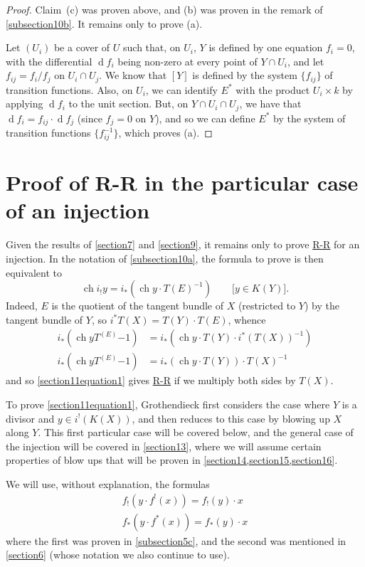 \documentclass{article}
\theoremstyle{plain}
\theoremstyle{definition}
\newcommand{\dd}{\operatorname{d}\!}
\DeclareMathOperator{\ch}{ch}
\newcommand{\oldpage}[1]{\marginpar{\footnotesize$\Big\vert$ \textit{p.~#1}}}
\begin{document}
\begin{proof}
\oldpage{124}
  Claim~(c) was proven above, and (b) was proven in the remark of \cref{subsection10b}.
  It remains only to prove (a).

  Let $(U_i)$ be a cover of $U$ such that, on $U_i$, $Y$ is defined by one equation $f_i=0$, with the differential $\dd f_i$ being non-zero at every point of $Y\cap U_i$, and let $f_{ij}=f_i/f_j$ on $U_i\cap U_j$.
  We know that $[Y]$ is defined by the system $\{f_{ij}\}$ of transition functions.
  Also, on $U_i$, we can identify $E^*$ with the product $U_i\times k$ by applying $\dd f_i$ to the unit section.
  But, on $Y\cap U_i\cap U_j$, we have that $\dd f_i=f_{ij}\cdot\dd f_j$ (since $f_j=0$ on $Y$), and so we can define $E^*$ by the system of transition functions $\{f_{ij}^{-1}\}$, which proves (a).
\end{proof}


\section{Proof of R-R in the particular case of an injection}
\label{section11}

Given the results of \cref{section7} and \cref{section9}, it remains only to prove \hyperref[theoremriemannroch]{R-R} for an injection.
In the notation of \cref{subsection10a}, the formula to prove is then equivalent to
\[
\label{section11equation1}
  \ch i_!y = i_*(\ch y\cdot T(E)^{-1})
  \qquad\mbox{[$y\in K(Y)$].}
  \tag{1}
\]
Indeed, $E$ is the quotient of the tangent bundle of $X$ (restricted to $Y$) by the tangent bundle of $Y$, so $i^*T(X) = T(Y)\cdot T(E)$, whence
\begin{align*}
  i_*(\ch y T^(E){-1}) &= i_*(\ch y\cdot T(Y)\cdot i^*(T(X))^{-1})
\\i_*(\ch y T^(E){-1}) &= i_*(\ch y\cdot T(Y))\cdot T(X)^{-1}
\end{align*}
and so \cref{section11equation1} gives \hyperref[theoremriemannroch]{R-R} if we multiply both sides by $T(X)$.

To prove \cref{section11equation1}, Grothendieck first considers the case where $Y$ is a divisor and $y\in i^!(K(X))$, and then reduces to this case by blowing up $X$ along $Y$.
This first particular case will be covered below, and the general case of the injection will be covered in \cref{section13}, where we will assume certain properties of blow ups that will be proven in \cref{section14,section15,section16}.

We will use, without explanation, the formulas
\[
\label{section11equation2}
  \begin{aligned}
    f_!(y\cdot f^!(x)) = f_!(y)\cdot x
  \\f_*(y\cdot f^*(x)) = f_*(y)\cdot x
  \end{aligned}
  \tag{2}
\]
where the first was proven in \cref{subsection5c}, and the second was mentioned in \cref{section6} (whose notation we also continue to use).
\end{document}
